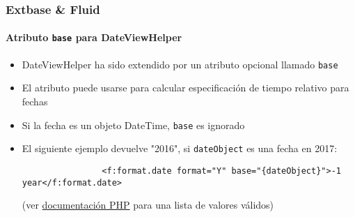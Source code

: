 \begin{frame}[fragile]
	\frametitle{Extbase \& Fluid}
	\framesubtitle{Atributo \texttt{base} para DateViewHelper}


	\begin{itemize}

		\item DateViewHelper ha sido extendido por un atributo opcional llamado \texttt{base}
		\item El atributo puede usarse para calcular especificación de tiempo relativo para fechas
		\item Si la fecha es un objeto DateTime, \texttt{base} es ignorado
		\item El siguiente ejemplo devuelve "2016", si \texttt{dateObject} es una fecha en 2017:

			\begin{lstlisting}
				<f:format.date format="Y" base="{dateObject}">-1 year</f:format.date>
			\end{lstlisting}

		\small
			(ver \href{http://www.php.net/manual/en/datetime.formats.relative.php}{documentación PHP} para una lista de valores válidos)
		\normalsize

	\end{itemize}

\end{frame}


